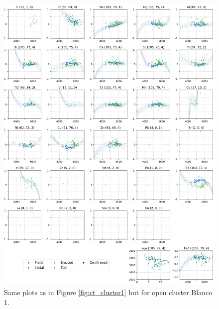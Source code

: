 \begin{figure}
	\centering
	\includegraphics[width=\textwidth]{p_teff_abundances_Blanco_1_orbits_DR3_new_flag0.png}
	\caption{Same plots as in Figure \ref{fig:ct_cluster1} but for open cluster Blanco 1.}
	\label{fig:ct_cluster2}
\end{figure}

